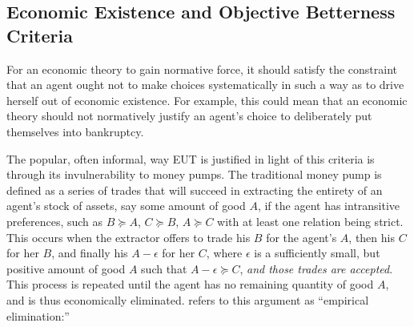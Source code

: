 \documentclass[../main.tex]{subfiles}
\begin{document}

\singlespacing
\subsection{Economic Existence and Objective Betterness Criteria}
\doublespacing

For an economic theory to gain normative force, it should satisfy the constraint that an agent ought not to make choices systematically in such a way as to drive herself out of economic existence.
For example, this could mean that an economic theory should not normatively justify an agent's choice to deliberately put themselves into bankruptcy.{\footnotemark}

\addtocounter{footnote}{-1}

The popular, often informal, way EUT is justified in light of this criteria is through its invulnerability to money pumps.
The traditional money pump is defined as a series of trades that will succeed in extracting the entirety of an agent's stock of assets, say some amount of good $A$, if the agent has intransitive preferences, such as $B \succcurlyeq A$, $C \succcurlyeq B$, $A \succcurlyeq C$ with at least one relation being strict.
This occurs when the extractor offers to trade his $B$ for the agent's $A$, then his $C$ for her $B$, and finally his $A - \epsilon$ for her $C$, where $\epsilon$ is a sufficiently small, but positive amount of good $A$ such that $A - \epsilon \succcurlyeq C$, \textit{and those trades are accepted}.
This process is repeated until the agent has no remaining quantity of good $A$, and is thus economically eliminated.
\textcite[402-403]{Hands2014} refers to this argument as \enquote{empirical elimination:}
\end{document}
